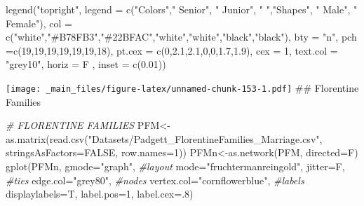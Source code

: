 \documentclass[
  notitlepage,
  onecolumn,
  openany]{book}
\newenvironment{Shaded}{\begin{snugshade}}{\end{snugshade}}
\newcommand{\AttributeTok}[1]{\textcolor[rgb]{0.77,0.63,0.00}{#1}}
\newcommand{\CommentTok}[1]{\textcolor[rgb]{0.56,0.35,0.01}{\textit{#1}}}
\newcommand{\ConstantTok}[1]{\textcolor[rgb]{0.00,0.00,0.00}{#1}}
\newcommand{\DecValTok}[1]{\textcolor[rgb]{0.00,0.00,0.81}{#1}}
\newcommand{\FloatTok}[1]{\textcolor[rgb]{0.00,0.00,0.81}{#1}}
\newcommand{\FunctionTok}[1]{\textcolor[rgb]{0.00,0.00,0.00}{#1}}
\newcommand{\NormalTok}[1]{#1}
\newcommand{\OtherTok}[1]{\textcolor[rgb]{0.56,0.35,0.01}{#1}}
\newcommand{\StringTok}[1]{\textcolor[rgb]{0.31,0.60,0.02}{#1}}
\begin{document}
\begin{Shaded}
\begin{Highlighting}[]
\FunctionTok{legend}\NormalTok{(}\StringTok{"topright"}\NormalTok{,}
       \AttributeTok{legend =} \FunctionTok{c}\NormalTok{(}\StringTok{"Colors"}\NormalTok{,}\StringTok{" Senior"}\NormalTok{, }\StringTok{" Junior"}\NormalTok{, }\StringTok{" "}\NormalTok{,}\StringTok{"Shapes"}\NormalTok{, }\StringTok{" Male"}\NormalTok{, }\StringTok{" Female"}\NormalTok{),}
       \AttributeTok{col =} \FunctionTok{c}\NormalTok{(}\StringTok{"white"}\NormalTok{,}\StringTok{"\#B78FB3"}\NormalTok{,}\StringTok{"\#22BFAC"}\NormalTok{,}\StringTok{"white"}\NormalTok{,}\StringTok{"white"}\NormalTok{,}\StringTok{"black"}\NormalTok{,}\StringTok{"black"}\NormalTok{), }
       \AttributeTok{bty =} \StringTok{"n"}\NormalTok{, }
       \AttributeTok{pch =}\FunctionTok{c}\NormalTok{(}\DecValTok{19}\NormalTok{,}\DecValTok{19}\NormalTok{,}\DecValTok{19}\NormalTok{,}\DecValTok{19}\NormalTok{,}\DecValTok{19}\NormalTok{,}\DecValTok{19}\NormalTok{,}\DecValTok{18}\NormalTok{),}
       \AttributeTok{pt.cex =} \FunctionTok{c}\NormalTok{(}\DecValTok{0}\NormalTok{,}\FloatTok{2.1}\NormalTok{,}\FloatTok{2.1}\NormalTok{,}\DecValTok{0}\NormalTok{,}\DecValTok{0}\NormalTok{,}\FloatTok{1.7}\NormalTok{,}\FloatTok{1.9}\NormalTok{), }
       \AttributeTok{cex =} \DecValTok{1}\NormalTok{, }
       \AttributeTok{text.col =} \StringTok{"grey10"}\NormalTok{, }
       \AttributeTok{horiz =}\NormalTok{ F , }
       \AttributeTok{inset =} \FunctionTok{c}\NormalTok{(}\FloatTok{0.01}\NormalTok{))}
\end{Highlighting}
\end{Shaded}

\texttt{[image: \_main\_files/figure-latex/unnamed-chunk-153-1.pdf]}
\#\# Florentine Families

\begin{Shaded}
\begin{Highlighting}[]
\CommentTok{\# FLORENTINE FAMILIES}
\NormalTok{PFM}\OtherTok{\textless{}{-}}\FunctionTok{as.matrix}\NormalTok{(}\FunctionTok{read.csv}\NormalTok{(}\StringTok{"Datasets/Padgett\_FlorentineFamilies\_Marriage.csv"}\NormalTok{,}
                        \AttributeTok{stringsAsFactors=}\ConstantTok{FALSE}\NormalTok{, }\AttributeTok{row.names=}\DecValTok{1}\NormalTok{))}
\NormalTok{PFMn}\OtherTok{\textless{}{-}}\FunctionTok{as.network}\NormalTok{(PFM, }\AttributeTok{directed=}\NormalTok{F)}
\FunctionTok{gplot}\NormalTok{(PFMn, }
      \AttributeTok{gmode=}\StringTok{"graph"}\NormalTok{,}
      \CommentTok{\#layout}
      \AttributeTok{mode=}\StringTok{"fruchtermanreingold"}\NormalTok{,}
      \AttributeTok{jitter=}\NormalTok{F,}
      \CommentTok{\#ties}
      \AttributeTok{edge.col=}\StringTok{"grey80"}\NormalTok{,}
      \CommentTok{\#nodes}
      \AttributeTok{vertex.col=}\StringTok{"cornflowerblue"}\NormalTok{,}
      \CommentTok{\#labels}
      \AttributeTok{displaylabels=}\NormalTok{T,}
      \AttributeTok{label.pos=}\DecValTok{1}\NormalTok{,}
      \AttributeTok{label.cex=}\NormalTok{.}\DecValTok{8}\NormalTok{)}
\end{Highlighting}
\end{Shaded}
\end{document}
